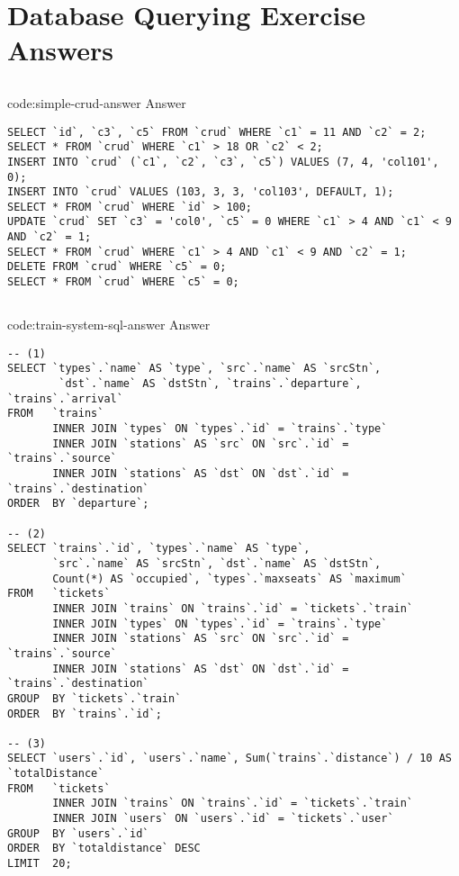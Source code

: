 \section{Database Querying Exercise Answers}\label{sect:database-querying-answers}

\subsection*{}

\begin{codeenv}{code:simple-crud-answer}{ Answer}\begin{verbatim}
SELECT `id`, `c3`, `c5` FROM `crud` WHERE `c1` = 11 AND `c2` = 2;
SELECT * FROM `crud` WHERE `c1` > 18 OR `c2` < 2;
INSERT INTO `crud` (`c1`, `c2`, `c3`, `c5`) VALUES (7, 4, 'col101', 0);
INSERT INTO `crud` VALUES (103, 3, 3, 'col103', DEFAULT, 1);
SELECT * FROM `crud` WHERE `id` > 100;
UPDATE `crud` SET `c3` = 'col0', `c5` = 0 WHERE `c1` > 4 AND `c1` < 9 AND `c2` = 1;
SELECT * FROM `crud` WHERE `c1` > 4 AND `c1` < 9 AND `c2` = 1;
DELETE FROM `crud` WHERE `c5` = 0;
SELECT * FROM `crud` WHERE `c5` = 0;
\end{verbatim}
\end{codeenv}

\subsection*{}

\begin{codeenv}{code:train-system-sql-answer}{ Answer}\begin{verbatim}
-- (1)
SELECT `types`.`name` AS `type`, `src`.`name` AS `srcStn`,
        `dst`.`name` AS `dstStn`, `trains`.`departure`, `trains`.`arrival`
FROM   `trains`
       INNER JOIN `types` ON `types`.`id` = `trains`.`type`
       INNER JOIN `stations` AS `src` ON `src`.`id` = `trains`.`source`
       INNER JOIN `stations` AS `dst` ON `dst`.`id` = `trains`.`destination`
ORDER  BY `departure`;

-- (2)
SELECT `trains`.`id`, `types`.`name` AS `type`,
       `src`.`name` AS `srcStn`, `dst`.`name` AS `dstStn`,
       Count(*) AS `occupied`, `types`.`maxseats` AS `maximum`
FROM   `tickets`
       INNER JOIN `trains` ON `trains`.`id` = `tickets`.`train`
       INNER JOIN `types` ON `types`.`id` = `trains`.`type`
       INNER JOIN `stations` AS `src` ON `src`.`id` = `trains`.`source`
       INNER JOIN `stations` AS `dst` ON `dst`.`id` = `trains`.`destination`
GROUP  BY `tickets`.`train`
ORDER  BY `trains`.`id`;

-- (3)
SELECT `users`.`id`, `users`.`name`, Sum(`trains`.`distance`) / 10 AS `totalDistance`
FROM   `tickets`
       INNER JOIN `trains` ON `trains`.`id` = `tickets`.`train`
       INNER JOIN `users` ON `users`.`id` = `tickets`.`user`
GROUP  BY `users`.`id`
ORDER  BY `totaldistance` DESC
LIMIT  20;
\end{verbatim}
\end{codeenv}

